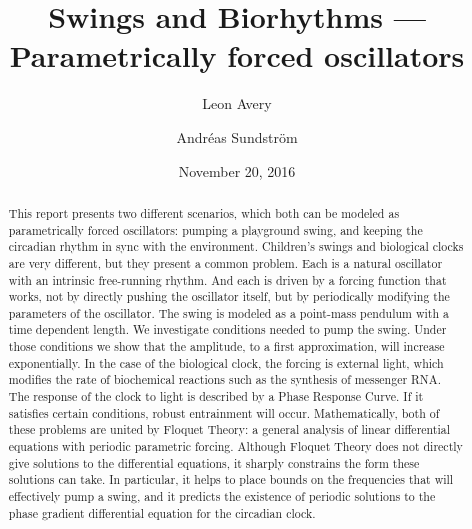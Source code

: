 \documentclass[11pt,letter, english,%
]{article}
\begin{document}

\title{\vspace{-1cm}
Swings and Biorhythms --- Parametrically forced oscillators}
\author{Leon Avery \and Andréas Sundstr{\"o}m}
\date{November 20, 2016}

\maketitle

\begin{abstract}\noindent
This report presents two different scenarios, which both can be
modeled as parametrically forced oscillators: pumping a playground
swing, and keeping the circadian rhythm in sync with the
environment. 
Children's swings and biological clocks are very different, but they
present a common problem. Each is a natural oscillator with an
intrinsic free-running rhythm. And each is driven by a forcing
function that works, not by directly pushing the oscillator itself,
but by periodically modifying the parameters of the oscillator.
The swing is modeled as a point-mass pendulum with a time
dependent length. We investigate conditions needed to pump the
swing. Under those conditions we show that the amplitude, to a first
approximation, will increase exponentially.
In the case of the biological clock, the forcing is external light,
which modifies the rate of biochemical reactions such as the synthesis
of messenger RNA. The response of the clock to light is described by a
Phase Response Curve. If it satisfies certain conditions, robust
entrainment will occur.
Mathematically, both of these problems are
united by Floquet Theory: a general analysis of linear differential
equations with periodic parametric forcing. Although Floquet Theory
does not directly give solutions to the differential equations, it
sharply constrains the form these solutions can take. In particular,
it helps to place bounds on the frequencies that will effectively pump
a swing, and it predicts the existence of periodic solutions to the
phase gradient differential equation for the circadian clock.  

\end{abstract}







\end{document}

